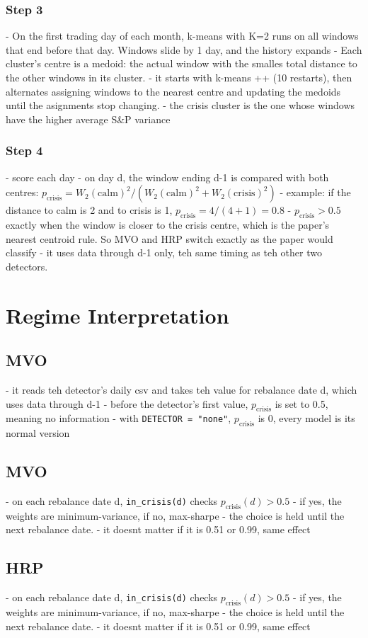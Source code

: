 \documentclass[12pt]{article}
\begin{document}
\subsubsection{Step 3}
- On the first trading day of each month, k-means with K=2 runs on all windows that end before that day. Windows slide 
by 1 day, and the history expands
- Each cluster's centre is a medoid: the actual window with the smalles total distance to the other windows in its 
cluster. 
- it starts with k-means ++ (10 restarts), then alternates assigning windows to the nearest centre and updating the 
medoids until the asignments stop changing.
- the crisis cluster is the one whose windows have the higher average S\&P variance
\subsubsection{Step 4}
- score each day
- on day d, the window ending d-1 is compared with both centres: $p_{\text{crisis}} = W_2(\text{calm})^2 / (W_2(\text{calm})^2 + W_2(\text{crisis})^2)$
- example: if the distance to calm is 2 and to crisis is 1, $p_{\text{crisis}} = 4 / (4 + 1) = 0.8$
- $p_{\text{crisis}} > 0.5$ exactly when the window is closer to the crisis centre, which is the paper's nearest centroid 
rule. So MVO and HRP switch exactly as the paper would classify
- it uses data through d-1 only, teh same timing as teh other two detectors.

\section{Regime Interpretation}
\subsection{MVO}
- it reads teh detector's daily csv and takes teh value for rebalance date d, which uses data through d-1
- before the detector's first value, $p_{\text{crisis}}$ is set to 0.5, meaning no information
- with \texttt{DETECTOR = "none"}, $p_{\text{crisis}}$ is 0, every model is its normal version
\subsection{MVO}
- on each rebalance date d, \texttt{in\_crisis(d)} checks $p_{\text{crisis}}(d) > 0.5$
- if yes, the weights are minimum-variance, if no, max-sharpe
- the choice is held until the next rebalance date. 
- it doesnt matter if it is 0.51 or 0.99, same effect
\subsection{HRP}
- on each rebalance date d, \texttt{in\_crisis(d)} checks $p_{\text{crisis}}(d) > 0.5$
- if yes, the weights are minimum-variance, if no, max-sharpe
- the choice is held until the next rebalance date. 
- it doesnt matter if it is 0.51 or 0.99, same effect
\end{document}
